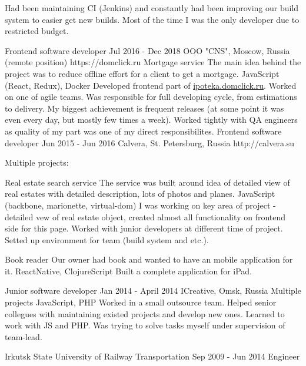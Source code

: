 \documentclass[11pt,a4paper,sans]{awesomecv}
\begin{document}
\begin{cventries}
{\begin{cvprojects}{0.8ex}
{            Had been maintaining CI (Jenkins) and constantly had been improving our build system to easier get new builds.
            Most of the time I was the only developer due to restricted budget.
          }
      \end{cvprojects}
    }
\cventry
    {Frontend software developer}
    {Jul 2016 - Dec 2018}
    {OOO "CNS", Moscow, Russia (remote position)}
    {https://domclick.ru}
    {
      \cvproject
          {Mortgage service}
          {}
          {The main idea behind the project was to reduce offline effort for a client to get a mortgage.}
          {JavaScript (React, Redux), Docker}
          {
            Developed frontend part of \href{http://ipoteka.domclick.ru}{ipoteka.domclick.ru}.
            Worked on one of agile teams.
            Was responsible for full developing cycle, from estimations to delivery.
            My biggest achievement is frequent releases (at some point it was even
            every day, but mostly few times a week).
            Worked tightly with QA engineers as quality of my part was one of my direct responsibilites.
          }
    }
\cventry
    {Frontend software developer}
    {Jun 2015 - Jun 2016}
    {Calvera, St. Petersburg, Russia}
    {http://calvera.su}
    {
      Multiple projects:\newline
      \begin{cvprojects}{0.8ex}
        \item \cvproject
            {Real estate search service}
            {}
            {The service was built around idea of detailed view of real estates with detailed description, lots of photos and planes.}
            {JavaScript (backbone, marionette, virtual-dom)}
            {
              I was working on key area of project - detailed vew of real estate object,
              created almost all functionality on frontend side for this page.
              Worked with junior developers at different time of project.
              Setted up environment for team (build system and etc.).
            }
        \item \cvproject
            {Book reader}
            {}
            {Our owner had book and wanted to have an mobile application for it.}
            {ReactNative, ClojureScript}
            {Built a complete application for iPad.}
      \end{cvprojects}
    }
\cventry
    {Junior software developer}
    {Jan 2014 - April 2014}
    {ICreative, Omsk, Russia}{}
    {
      Multiple projects\newline
      \vspace{0.8ex}
      \cvproject
          {}{}{}
          {JavaScript, PHP}
          {
            Worked in a small outsource team.
            Helped senior collegues with maintaining existed projects and develop new ones.
            Learned to work with JS and PHP. Was trying to solve tasks myself under supervision of team-lead.
          }
    }
\end{cventries}

\begin{cventries}
\cventry
    {Irkutsk State University of Railway Transportation}
    {Sep 2009 - Jun 2014}
    {Engineer}
    {}
    {}
\end{cventries}
\end{document}

